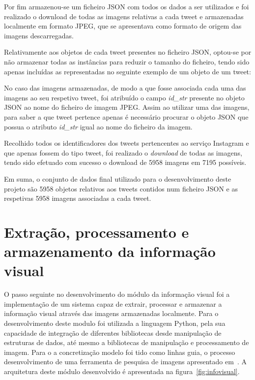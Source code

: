 Por fim armazenou-se um ficheiro JSON com todos os dados a ser utilizados e foi realizado o download de todas as imagens relativas a cada tweet e armazenadas localmente em formato JPEG, que se apresentava como formato de origem das imagens descarregadas. 

Relativamente aos objetos de cada tweet presentes no ficheiro JSON, optou-se por não armazenar todas as instâncias para reduzir o tamanho do ficheiro, tendo sido apenas incluídas as representadas no seguinte exemplo de um objeto de um tweet:



No caso das imagens armazenadas, de modo a que fosse associada cada uma das imagens ao seu respetivo tweet, foi atribuído o campo \textit{id\_str} presente no objeto JSON ao nome do ficheiro de imagem JPEG. Assim ao utilizar uma das imagens, para saber a que tweet pertence apenas é necessário procurar o objeto JSON que possua o atributo \textit{id\_str} igual ao nome do ficheiro da imagem.

Recolhido todos os identificadores dos tweets pertencentes ao serviço Instagram e que apenas fossem do tipo tweet, foi realizado o \textit{download} de todas as imagens, tendo sido efetuado com sucesso o download de 5958 imagens em 7195 possíveis.

Em suma, o conjunto de dados final utilizado para o desenvolvimento deste projeto são 5958 objetos relativos aos tweets contidos num ficheiro JSON e as respetivas 5958 imagens associadas a cada tweet.

\section{Extração, processamento e armazenamento da informação visual} \label{sec:extract}

O passo seguinte no desenvolvimento do módulo da informação visual foi a implementação de um sistema capaz de extrair, processar e armazenar a informação visual através das imagens armazenadas localmente. Para o desenvolvimento deste modulo foi utilizada a linguagem Python, pela sua capacidade de integração de diferentes bibliotecas desde manipulação de estruturas de dados, até mesmo a bibliotecas de manipulação e processamento de imagem. Para o a concretização modelo foi tido como linhas guia, o processo desenvolvimento de uma ferramenta de pesquisa de imagens apresentado em~\cite{Solem2012}. A arquitetura deste módulo desenvolvido é apresentada na figura~\ref{fig:infovisual}.

